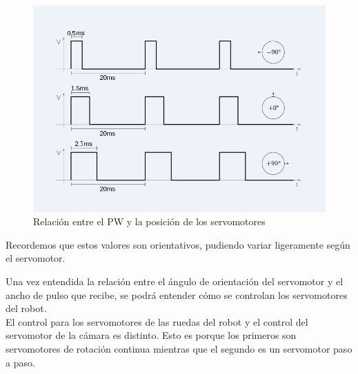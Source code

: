\documentclass[twoside, 11pt]{epstfg}
\begin{document}
\begin{figure}[h!]
	\centerline{
		\mbox{\includegraphics[width=.80\textwidth]{images/PWMServos.png}}
	}
	\caption{Relación entre el PW y la posición de los servomotores}
	\label{figPWM}
\end{figure}

Recordemos que estos valores son orientativos, pudiendo variar ligeramente según el servomotor.

%
%
%
%
%
%
%
%

Una vez entendida la relación entre el ángulo de orientación del servomotor y el ancho de pulso que recibe, se podrá entender cómo se controlan los servomotores del robot.\\ El control para los servomotores de las ruedas del robot y el control del servomotor de la cámara es distinto. Esto es porque los primeros son servomotores de rotación continua mientras que el segundo es un servomotor paso a paso.
\end{document}
